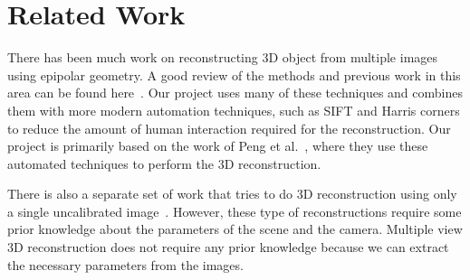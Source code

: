\section{Related Work}
\label{s:related}
There has been much work on reconstructing 3D object from multiple images using epipolar geometry. A good review of the methods and previous work in this area can be found here~\cite{epipolar_review}. Our project uses many of these techniques and combines them with more modern automation techniques, such as SIFT and Harris corners to reduce the amount of human interaction required for the reconstruction. Our project is primarily based on the work of Peng et al.~\cite{SIFT/Harris}, where they use these automated techniques to perform the 3D reconstruction.

There is also a separate set of work that tries to do 3D reconstruction using only a single uncalibrated image~\cite{single_image, single_image2}. However, these type of reconstructions require some prior knowledge about the parameters of the scene and the camera. Multiple view 3D reconstruction does not require any prior knowledge because we can extract the necessary parameters from the images.